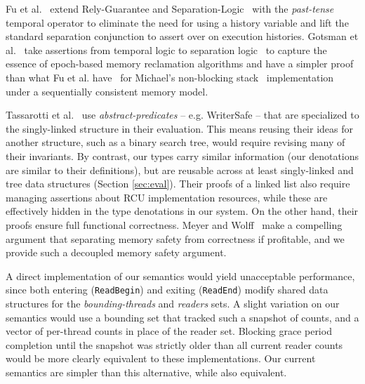  Fu et al.~\cite{shao_temp} extend Rely-Guarantee and Separation-Logic~\cite{vafeiadis07,Feng:2007:RCS:1762174.1762193,Feng:2009:LRR:1480881.1480922} with the \textit{past-tense} temporal operator to eliminate the need for using a history variable and lift the standard separation conjunction to assert over on execution histories. Gotsman et al.~\cite{Gotsman:2013:VCM:2450268.2450289} take assertions from temporal logic to separation logic~\cite{vafeiadis07} to capture the essence of epoch-based memory reclamation algorithms and have a simpler proof than what Fu et al. have~\cite{shao_temp} for Michael's non-blocking stack~\cite{Michael:2004:HPS:987524.987595} implementation under a sequentially consistent memory model.

Tassarotti et al.~\cite{verrcu} use \textit{abstract-predicates} -- e.g. WriterSafe -- that are specialized to the singly-linked structure in their evaluation.  This means reusing their ideas for another structure, such as a binary search tree, would require revising many of their invariants.  By contrast, our types carry similar information (our denotations are similar to their definitions), but are reusable across at least singly-linked and tree data structures (Section \ref{sec:eval}). 
Their proofs of a linked list also require managing assertions about RCU implementation resources, while these are effectively hidden in the type denotations in our system.
On the other hand, their proofs ensure full functional correctness.  Meyer and Wolff~\cite{myr} make a compelling argument that separating memory safety from correctness if profitable, and we provide such a decoupled memory safety argument. 

 A direct implementation of our semantics would yield unacceptable performance, since both entering (\lstinline|ReadBegin|) and exiting (\lstinline|ReadEnd|) modify shared data structures for the \textit{bounding-threads} and \textit{readers} sets. A slight variation on our semantics would use a bounding set  that tracked such a snapshot of counts, and a vector of per-thread counts in place of the reader set. Blocking grace period completion until the snapshot was strictly older than all current reader counts would be more clearly equivalent to these implementations. Our current semantics are simpler than this alternative, while also equivalent. 

